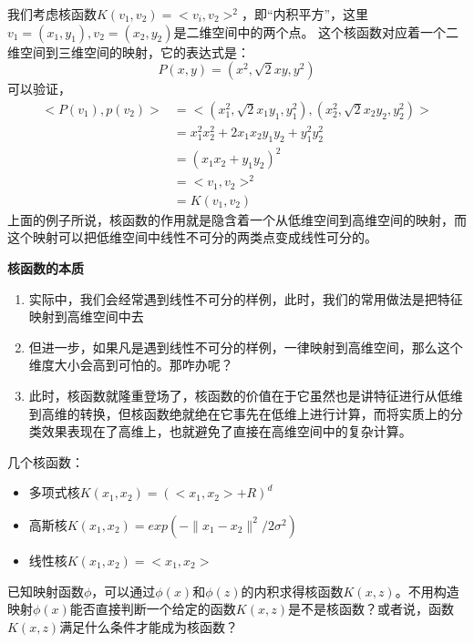 我们考虑核函数$K(v_1,v_2) = <v_i,v_2>^2$，即“内积平方”，这里$v_1 = (x_1,y_1),v_2 = (x_2,y_2)$是二维空间中的两个点。
这个核函数对应着一个二维空间到三维空间的映射，它的表达式是：
$$P(x,y) = (x^2,\sqrt{2}xy, y^2)$$
可以验证，
\begin{equation*}
	\begin{aligned}
		<P(v_1), p(v_2)> &= <(x_1^2,\sqrt{2}x_1y_1, y_1^2),(x_2^2,\sqrt{2}x_2y_2, y_2^2)> \\
		&= x_1^2x_2^2 + 2x_1x_2y_1y_2 + y_1^2y_2^2 \\
		&= (x_1x_2 + y_1y_2)^2 \\
		&= <v_1,v_2>^2 \\
		&= K(v_1,v_2)
	\end{aligned}
\end{equation*}
上面的例子所说，核函数的作用就是隐含着一个从低维空间到高维空间的映射，而这个映射可以把低维空间中线性不可分的两类点变成线性可分的。

\textbf{核函数的本质}
\begin{enumerate}
	\item 实际中，我们会经常遇到线性不可分的样例，此时，我们的常用做法是把特征映射到高维空间中去
	\item 但进一步，如果凡是遇到线性不可分的样例，一律映射到高维空间，那么这个维度大小会高到可怕的。那咋办呢？
	\item 此时，核函数就隆重登场了，核函数的价值在于它虽然也是讲特征进行从低维到高维的转换，但核函数绝就绝在它事先在低维上进行计算，而将实质上的分类效果表现在了高维上，也就避免了直接在高维空间中的复杂计算。
\end{enumerate}

几个核函数：
\begin{itemize}
	\item 多项式核$K(x_1,x_2) = (<x_1, x_2> + R)^d $
	\item 高斯核$K(x_1,x_2) = exp(-\lVert x_1 - x_2 \rVert ^2 / 2\sigma ^2)$
	\item 线性核$K(x_1,x_2) = <x_1, x_2> $
\end{itemize}

已知映射函数$\phi$，可以通过$\phi(x)$和$\phi(z)$的内积求得核函数$K(x,z)$。不用构造映射$\phi(x)$能否直接判断一个给定的函数$K(x,z)$是不是核函数？或者说，函数$K(x,z)$满足什么条件才能成为核函数？

